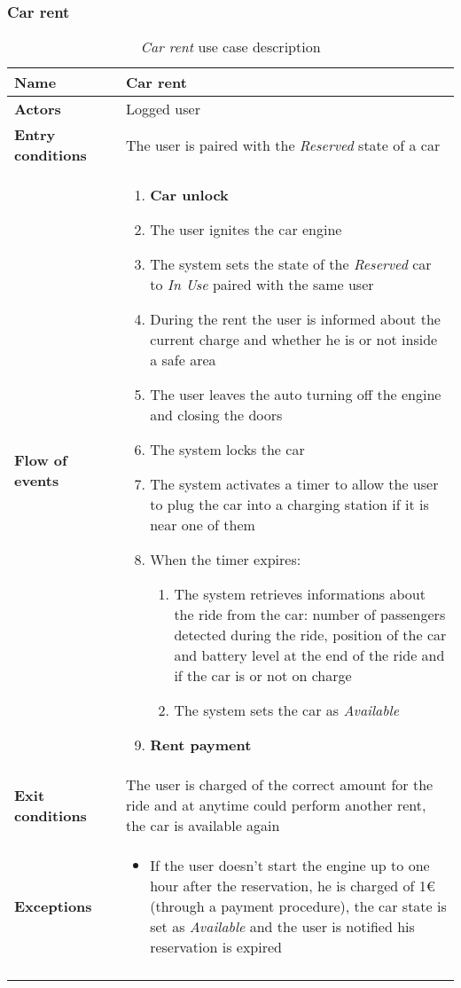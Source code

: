 \subsubsection{Car rent}
\begin{longtable}{p{0.25\linewidth}p{0.75\linewidth}}
\toprule
\textbf{Name} & \textbf{Car rent} \\
\midrule
\textbf{Actors} &  Logged user \\
\midrule
\textbf{Entry conditions} & 
The user is paired with the \emph{Reserved} state of a car\\
\midrule
\textbf{Flow of events} & 
\begin{enumerate}
	\item \textbf{Car unlock}
	\item The user ignites the car engine
	\item The system sets the state of the \emph{Reserved} car to \emph{In Use} paired
	with the same user
	\item During the rent the user is informed about the current charge and whether he is or not inside a safe area
	\item The user leaves the auto turning off the engine and closing the doors
	\item The system locks the car
    \item The system activates a timer to allow the user to plug the car into a charging station if it is
    near one of them
    \item When the timer expires:
    	\begin{enumerate}[label = 8.\arabic*]
    		\item The system retrieves informations about the ride from the car: number of passengers detected during the ride, position of the car and battery level at the end of the ride and if the car is or not on charge 
    		\item The system sets the car as \emph{Available}
    	\end{enumerate}
    \item \textbf{Rent payment}
\end{enumerate} \\
\midrule
\textbf{Exit conditions} & 
The user is charged of the correct amount for the ride and at anytime could perform another rent, the car is available again\\
\midrule
\textbf{Exceptions} & 
\begin{itemize}
	\item If the user doesn't start the engine up to one hour after the reservation, he is charged of 1\euro (through a payment procedure), the car state is set as \emph{Available} and the user is notified his reservation is expired
\end{itemize} \\
\bottomrule
\caption{\emph{Car rent} use case description}
\end{longtable}

